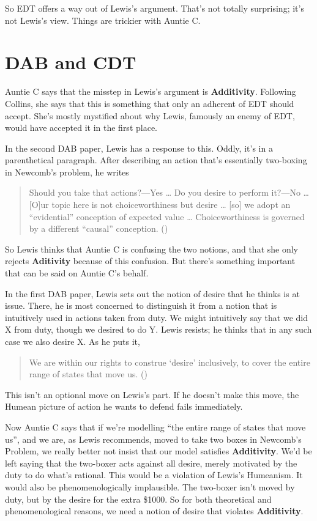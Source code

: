 \documentclass[
  11pt,
  letterpaper,
  DIV=11,
  numbers=noendperiod,
  twoside]{scrartcl}
\begin{document}
So EDT offers a way out of Lewis's argument. That's not totally
surprising; it's not Lewis's view. Things are trickier with Auntie C.

\section{DAB and CDT}\label{sec-auntie-c}

Auntie C says that the misstep in Lewis's argument is
\textbf{Additivity}. Following Collins, she says that this is something
that only an adherent of EDT should accept. She's mostly mystified about
why Lewis, famously an enemy of EDT, would have accepted it in the first
place.

In the second DAB paper, Lewis has a response to this. Oddly, it's in a
parenthetical paragraph. After describing an action that's essentially
two-boxing in Newcomb's problem, he writes

\begin{quote}
Should you take that actions?---Yes \ldots{} Do you desire to perform
it?---No \ldots{} {[}O{]}ur topic here is not choiceworthiness but
desire \ldots{} {[}so{]} we adopt an ``evidential'' conception of
expected value \ldots{} Choiceworthiness is governed by a different
``causal'' conception. ()
\end{quote}

So Lewis thinks that Auntie C is confusing the two notions, and that she
only rejects \textbf{Aditivity} because of this confusion. But there's
something important that can be said on Auntie C's behalf.

In the first DAB paper, Lewis sets out the notion of desire that he
thinks is at issue. There, he is most concerned to distinguish it from a
notion that is intuitively used in actions taken from duty. We might
intuitively say that we did X from duty, though we desired to do Y.
Lewis resists; he thinks that in any such case we also desire X. As he
puts it,

\begin{quote}
We are within our rights to construe `desire' inclusively, to cover the
entire range of states that move us. ()
\end{quote}

This isn't an optional move on Lewis's part. If he doesn't make this
move, the Humean picture of action he wants to defend fails immediately.

Now Auntie C says that if we're modelling ``the entire range of states
that move us'', and we are, as Lewis recommends, moved to take two boxes
in Newcomb's Problem, we really better not insist that our model
satisfies \textbf{Additivity}. We'd be left saying that the two-boxer
acts against all desire, merely motivated by the duty to do what's
rational. This would be a violation of Lewis's Humeanism. It would also
be phenomenologically implausible. The two-boxer isn't moved by duty,
but by the desire for the extra \$1000. So for both theoretical and
phenomenological reasons, we need a notion of desire that violates
\textbf{Additivity}.
\end{document}
